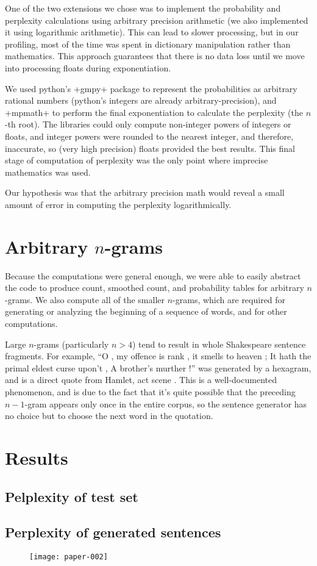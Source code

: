 \documentclass{article}
\newcommand{\osn}{\oldstylenums}
\begin{document}
		One of the two extensions we chose was to implement the probability and
		perplexity calculations using arbitrary precision arithmetic (we also
		implemented it using logarithmic arithmetic).  This can lead to slower
		processing, but in our profiling, most of the time was spent in
		dictionary manipulation rather than mathematics.  This approach
		guarantees that there is no data loss until we move into processing
		floats during exponentiation.

		We used python's +gmpy+ package to represent the probabilities as
		arbitrary rational numbers (python's integers are already
		arbitrary-precision), and +mpmath+ to perform the final exponentiation
		to calculate the perplexity (the $n$-th root).  The libraries could only
		compute non-integer powers of integers or floats, and integer powers
		were rounded to the nearest integer, and therefore, inaccurate, so
		(very high precision) floats provided the best results.  This final
		stage of computation of perplexity was the only point where imprecise
		mathematics was used.

		Our hypothesis was that the arbitrary precision math would reveal a
		small amount of error in computing the perplexity logarithmically.

	\section*{Arbitrary $n$-grams}
	
		Because the computations were general enough, we were able to easily
		abstract the code to produce count, smoothed count, and probability
		tables for arbitrary $n$-grams.  We also compute all of the smaller
		$n$-grams, which are required for generating or analyzing the beginning
		of a sequence of words, and for other computations.

		Large $n$-grams (particularly $n > 4$) tend to result in whole
		Shakespeare sentence fragments.  For example, ``O , my offence is rank ,
		it smells to heaven ; It hath the primal eldest curse upon't , A
		brother's murther !'' was generated by a hexagram, and is a direct quote
		from Hamlet, act \osn{3} scene \osn{3}.  This is a well-documented
		phenomenon, and is due to the fact that it's quite possible that the
		preceding $n-1$-gram appears only once in the entire corpus, so the
		sentence generator has no choice but to choose the next word in the
		quotation.
		
\section*{Results}
	
	\subsection*{Pelplexity of test set}
	
	\subsection*{Perplexity of generated sentences}
	\begin{figure}
	\begin{center}
\texttt{[image: paper-002]}
	\end{center}
	\end{figure}
\end{document}
